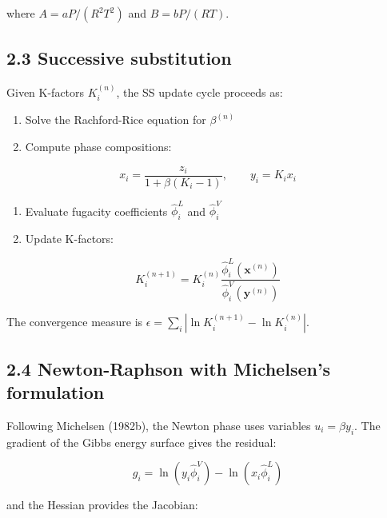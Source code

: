 \documentclass[review,3p]{custom}
\begin{document}
where $A = aP/(R^2T^2)$ and $B = bP/(RT)$.

\subsection{2.3 Successive substitution}

Given K-factors $K_i^{(n)}$, the SS update cycle proceeds as:

\begin{enumerate}
  \item Solve the Rachford-Rice equation for $\beta^{(n)}$
  \item Compute phase compositions:
\end{enumerate}

\begin{equation}

x_i = \frac{z_i}{1 + \beta(K_i - 1)}, \qquad y_i = K_i x_i

\end{equation}

\begin{enumerate}
  \item Evaluate fugacity coefficients $\hat\phi_i^L$ and $\hat\phi_i^V$
  \item Update K-factors:
\end{enumerate}

\begin{equation}

K_i^{(n+1)} = K_i^{(n)} \frac{\hat\phi_i^L(\mathbf{x}^{(n)})}{\hat\phi_i^V(\mathbf{y}^{(n)})}

\end{equation}

The convergence measure is $\epsilon = \sum_i |\ln K_i^{(n+1)} - \ln K_i^{(n)}|$.

\subsection{2.4 Newton-Raphson with Michelsen's formulation}

Following Michelsen (1982b), the Newton phase uses variables $u_i = \beta y_i$.
The gradient of the Gibbs energy surface gives the residual:

\begin{equation}

g_i = \ln(y_i \hat\phi_i^V) - \ln(x_i \hat\phi_i^L)

\end{equation}

and the Hessian provides the Jacobian:
\end{document}
